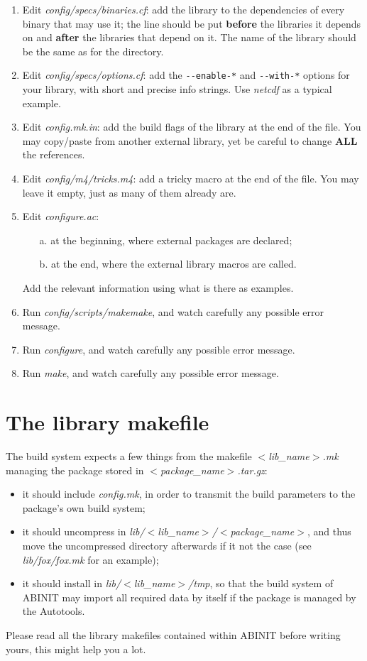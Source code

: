 \begin{enumerate}
\item Edit \textit{config/specs/binaries.cf}: add the library to the dependencies
of every binary that may use it; the line should be put \textbf{before}
the libraries it depends on and \textbf{after} the libraries that
depend on it. The name of the library should be the same as for the
directory. 
\item Edit \textit{config/specs/options.cf}: add the \texttt{-{}-enable-{*}}
and \texttt{-{}-with-{*}} options for your library, with short and
precise info strings. Use \textit{netcdf} as a typical example. 
\item Edit \textit{config.mk.in}: add the build flags of the library at
the end of the file. You may copy/paste from another external library,
yet be careful to change \textbf{ALL} the references. 
\item Edit \textit{config/m4/tricks.m4}: add a \textquotedbl{}tricky\textquotedbl{}
macro at the end of the file. You may leave it empty, just as many
of them already are. 
\item Edit \textit{configure.ac}: 

\begin{itemize}
\item [a. ] at the beginning, where external packages are declared; 
\item [b. ] at the end, where the external library macros are called. 
\end{itemize}
Add the relevant information using what is there as examples. 

\item Run \textit{config/scripts/makemake}, and watch carefully any possible
error message. 
\item Run \textit{configure}, and watch carefully any possible error message. 
\item Run \textit{make}, and watch carefully any possible error message. 
\end{enumerate}

\section{The library makefile}

The build system expects a few things from the makefile \textit{$<$lib\_name$>$.mk}
managing the package stored in \textit{$<$package\_name$>$.tar.gz}: 
\begin{itemize}
\item it should include \textit{config.mk}, in order to transmit the build
parameters to the package's own build system; 
\item it should uncompress in \textit{lib/$<$lib\_name$>$/$<$package\_name$>$},
and thus move the uncompressed directory afterwards if it not the
case (see \textit{lib/fox/fox.mk} for an example); 
\item it should install in \textit{lib/$<$lib\_name$>$/tmp}, so that the
build system of ABINIT may import all required data by itself if the
package is managed by the Autotools. 
\end{itemize}
Please read all the library makefiles contained within ABINIT before
writing yours, this might help you a lot.


